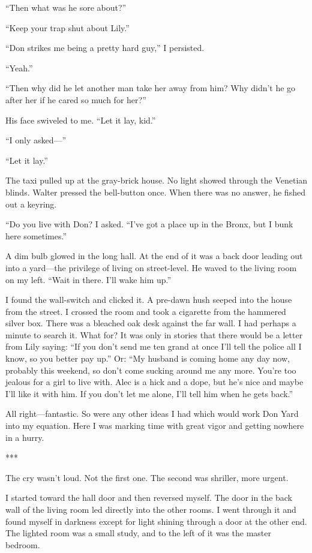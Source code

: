 \documentclass{novel}
\begin{document}
“Then what was he sore about?”

“Keep your trap shut about Lily.”

“Don strikes me being a pretty hard guy,” I persisted.

“Yeah.”

“Then why did he let another man take her away from him? Why didn’t he go after her if he cared so much for her?”

His face swiveled to me. “Let it lay, kid.”

“I only asked—”

“Let it lay.”

The taxi pulled up at the gray-brick house. No light showed through the Venetian blinds. Walter pressed the bell-button once. When there was no answer, he fished out a keyring.

“Do you live with Don? I asked. “I’ve got a place up in the Bronx, but I bunk here sometimes.”

A dim bulb glowed in the long hall. At the end of it was a back door leading out into a yard—the privilege of living on street-level. He waved to the living room on my left. “Wait in there. I’ll wake him up.”

I found the wall-switch and clicked it. A pre-dawn hush seeped into the house from the street. I crossed the room and took a cigarette from the hammered silver box. There was a bleached oak desk against the far wall. I had perhaps a minute to search it. What for? It was only in stories that there would be a letter from Lily saying: “If you don’t send me ten grand at once I’ll tell the police all I know, so you better pay up.” Or: “My husband is coming home any day now, probably this weekend, so don’t come sucking around me any more. You’re too jealous for a girl to live with. Alec is a hick and a dope, but he’s nice and maybe I’ll like it with him. If you don’t let me alone, I’ll tell him when he gets back.”

All right—fantastic. So were any other ideas I had which would work Don Yard into my equation. Here I was marking time with great vigor and getting nowhere in a hurry.

***

The cry wasn’t loud. Not the first one. The second was shriller, more urgent.

I started toward the hall door and then reversed myself. The door in the back wall of the living room led directly into the other rooms. I went through it and found myself in darkness except for light shining through a door at the other end. The lighted room was a small study, and to the left of it was the master bedroom.
\end{document}

